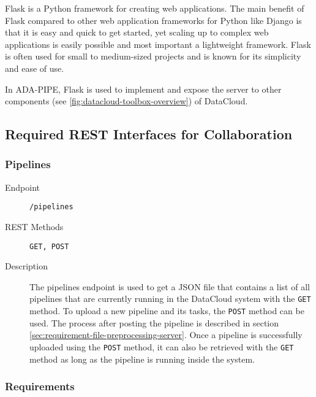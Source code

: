 \documentclass{article}
\begin{document}
            Flask \cite{WelcomeFlaskFlask} is a Python framework for creating web applications.
            The main benefit of Flask compared to other web application frameworks for Python like Django is that it is easy and quick to get started, yet scaling up to complex web applications is easily possible and most important a lightweight framework.
            Flask is often used for small to medium-sized projects and is known for its simplicity and ease of use.

            In ADA-PIPE, Flask is used to implement and expose the  server to other components (see \ref{fig:datacloud-toolbox-overview}) of DataCloud.

        
            \subsection{Required REST Interfaces for Collaboration}
            \label{sec:required-interfaces}
                
                \subsubsection{Pipelines}
                
                \begin{description}
                    \item[Endpoint] \texttt{/pipelines}
                    \item[REST Methods] \texttt{GET, POST}
                    \item[Description] The pipelines endpoint is used to get a JSON file that contains a list of all pipelines that are currently running in the DataCloud system with the \texttt{GET} method. To upload a new pipeline and its tasks, the \texttt{POST} method can be used. The process after posting the pipeline is described in section \ref{sec:requirement-file-preprocessing-server}. Once a pipeline is successfully uploaded using the \texttt{POST} method, it can also be retrieved with the \texttt{GET} method as long as the pipeline is running inside the system.
                \end{description}
                
                
                \subsubsection{Requirements}
                
\end{document}
